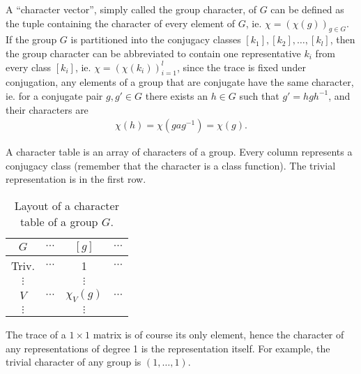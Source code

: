 \begin{notation}
	A ``character vector'', simply called the group character, of $G$ can be defined as the tuple containing the character of every element of $G$, ie. $\chi = (\chi(g))_{g \in G}$. If the group $G$ is partitioned into the conjugacy classes $[k_1], [k_2], \dots, [k_l]$, then the group character can be abbreviated to contain one representative $k_i$ from every class $[k_i]$, ie. $\chi= (\chi(k_i))_{i=1}^l$, since the trace is fixed under conjugation, any elements of a group that are conjugate have the same character, ie. for a conjugate pair $g,g' \in G$ there exists an $h \in G$ such that $g' = hgh^{-1}$, and their characters are
	\begin{align*}
		\chi(h) = \chi(gag^{-1}) = \chi(g).
	\end{align*}
\end{notation}

\begin{notation}
	A character table is an array of characters of a group.  Every column represents a conjugacy class (remember that the character is a class function).  The trivial representation is in the first row. 
	\begin{table}[hbt!]
		\centering
		\begin{tabular}{c | c c c }
			  $G$    & $\cdots $ & $[g]$        & $\cdots$ \\ \hline
			 Triv.   & $\cdots$  & 1            & $\cdots$ \\
			$\vdots$ &           & $\vdots$     &          \\
			  $V$    & $\cdots$  & $\chi_V(g) $ & $\cdots$ \\
			$\vdots$ &           & $\vdots$     &
		\end{tabular}
		\caption{Layout of a character table of a group $G$.}
		\label{table:chartableexample}
	\end{table}
\end{notation}

\begin{example}
	The  trace of a $1 \times 1$ matrix is of course its only element, hence the character of any representations of degree 1 is the representation itself.
	For example,  the trivial character of any group is $(1, \dots, 1)$. 
\end{example}


